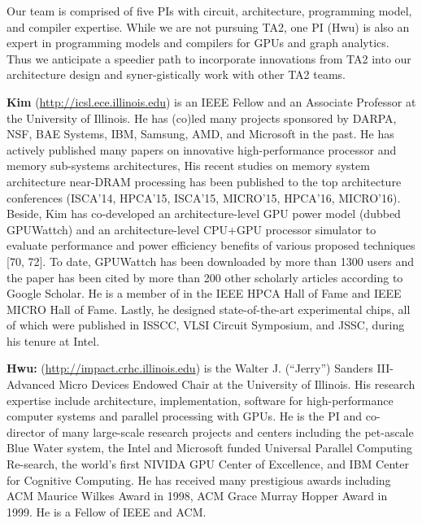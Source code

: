 Our team is comprised of five PIs with circuit, architecture, programming model, and compiler expertise. 
While we are not pursuing TA2, one PI (Hwu) is also an expert in programming models and compilers for GPUs and graph analytics. 
Thus we anticipate a speedier path to incorporate innovations from TA2 into our architecture design and syner-gistically work with other TA2 teams.

\vspace{3pt}
\noindent
\textbf{Kim} (\url{http://icsl.ece.illinois.edu}) is an IEEE Fellow and an Associate Professor at the University of Illinois. 
He has (co)led many projects sponsored by DARPA, NSF, BAE Systems, IBM, Samsung, AMD, and Microsoft in the past. 
He has actively published many papers on innovative high-performance processor and memory sub-systems architectures, 
His recent studies on memory system architecture near-DRAM processing has been published to the top architecture conferences (ISCA'14, HPCA'15, ISCA'15, MICRO'15, HPCA'16, MICRO'16).
Beside, Kim has co-developed an architecture-level GPU power model (dubbed GPUWattch) and an architecture-level CPU+GPU processor simulator to evaluate performance and power efficiency benefits of various proposed techniques [70, 72]. 
To date, GPUWattch has been downloaded by more than 1300 users and the paper has been cited by more than 200 other scholarly articles according to Google Scholar. 
He is a member of in the IEEE HPCA Hall of Fame and IEEE MICRO Hall of Fame. Lastly, he designed state-of-the-art experimental chips, all of which were published in ISSCC, VLSI Circuit Symposium, and JSSC, during his tenure at Intel.

\vspace{3pt}
\noindent
\textbf{Hwu:} (\url{http://impact.crhc.illinois.edu}) is the Walter J. (``Jerry'') Sanders III-Advanced Micro Devices Endowed Chair at the University of Illinois. 
His research expertise include architecture, implementation, software for high-performance computer systems and parallel processing with GPUs. 
He is the PI and co-director of many large-scale research projects and centers including the pet-ascale Blue Water system, the Intel and Microsoft funded Universal Parallel Computing Re-search, the world’s first NIVIDA GPU Center of Excellence, and IBM Center for Cognitive Computing. 
He has received many prestigious awards including ACM Maurice Wilkes Award in 1998, ACM Grace Murray Hopper Award in 1999. He is a Fellow of IEEE and ACM.

